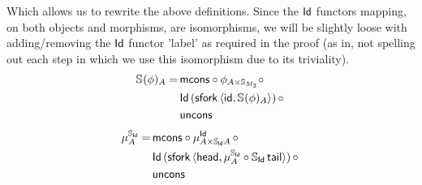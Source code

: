 \documentclass{article}
\begin{document}
Which allows us to rewrite the above definitions. Since the $\mathsf{Id}$ functors mapping, on both objects and morphisms, are isomorphisms, we will be slightly loose with adding/removing the $\mathsf{Id}$ functor 'label' as required in the proof (as in, not spelling out each step in which we use this isomorphism due to its triviality).
\begin{align*}
	\mathbb{S}_{}(\phi)_A =\,&\mathsf{mcons} \circ \phi_{A \times \mathbb{S}_{M_2}} \circ\, \\
	&\mathsf{Id}\,(\mathsf{sfork}\,\langle \mathsf{id}, \mathbb{S}_{}(\phi)_A \rangle)\, \circ\, \\ 
	&\mathsf{uncons}
\end{align*}
\begin{align*}
	\mu^{\mathbb{S}_{\mathsf{Id}}}_A =\, &\mathsf{mcons} \circ \mu^{\mathsf{Id}}_{A \times \mathbb{S}_{\mathsf{Id}}A}\, \circ\, \\
	&\mathsf{Id}\,(\mathsf{sfork}\,\langle \mathsf{head}, \mu^{\mathbb{S}_{\mathsf{Id}}}_A \circ \mathbb{S}_{\mathsf{Id}}\,\mathsf{tail} \rangle)\, \circ\, \\
	&\mathsf{uncons}
\end{align*}
\end{document}

